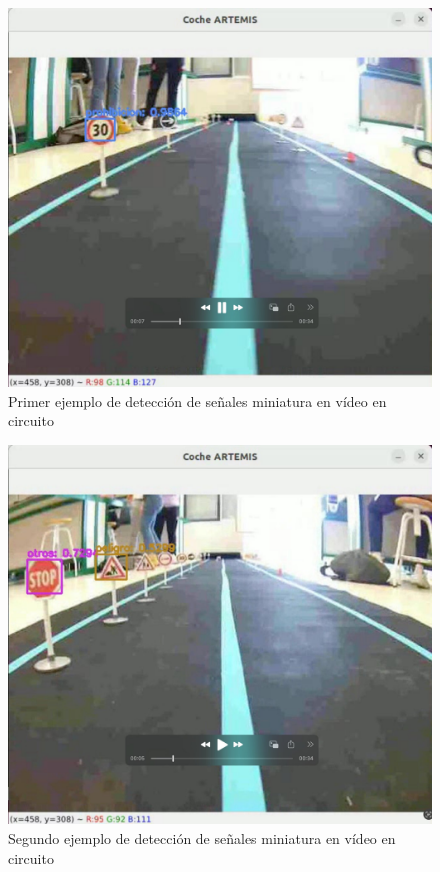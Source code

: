 \begin{figure}[H]
    \centering
 	\includegraphics[width=\textwidth]{Imagenes/IA/deteccion1.pdf}
    \caption{Primer ejemplo de detección de señales miniatura en vídeo en circuito}
    \label{deteccion1}
\end{figure}

\begin{figure}[H]
    \centering
 	\includegraphics[width=\textwidth]{Imagenes/IA/deteccion2.pdf}
    \caption{Segundo ejemplo de detección de señales miniatura en vídeo en circuito}
    \label{deteccion2}
\end{figure}

